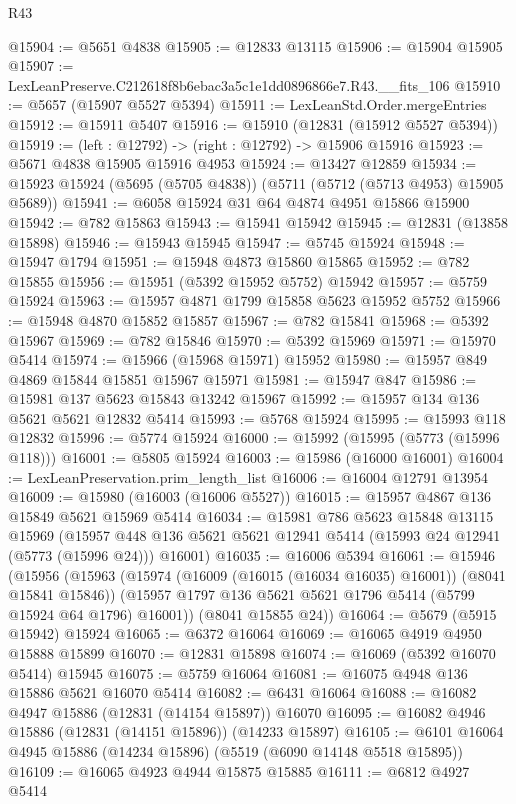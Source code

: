 \begin{lexlean}{R43}
\begin{coremodule}
@15904 := @5651 @4838
@15905 := @12833 @13115
@15906 := @15904 @15905
@15907 := LexLeanPreserve.C212618f8b6ebac3a5c1e1dd0896866e7.R43.__fits_106
@15910 := @5657 (@15907 @5527 @5394)
@15911 := LexLeanStd.Order.mergeEntries
@15912 := @15911 @5407
@15916 := @15910 (@12831 (@15912 @5527 @5394))
@15919 := (left : @12792) -> (right : @12792) -> @15906 @15916
@15923 := @5671 @4838 @15905 @15916 @4953
@15924 := @13427 @12859
@15934 := @15923 @15924 (@5695 (@5705 @4838)) (@5711 (@5712 (@5713 @4953) @15905 @5689))
@15941 := @6058 @15924 @31 @64 @4874 @4951 @15866 @15900
@15942 := @782 @15863
@15943 := @15941 @15942
@15945 := @12831 (@13858 @15898)
@15946 := @15943 @15945
@15947 := @5745 @15924
@15948 := @15947 @1794
@15951 := @15948 @4873 @15860 @15865
@15952 := @782 @15855
@15956 := @15951 (@5392 @15952 @5752) @15942
@15957 := @5759 @15924
@15963 := @15957 @4871 @1799 @15858 @5623 @15952 @5752
@15966 := @15948 @4870 @15852 @15857
@15967 := @782 @15841
@15968 := @5392 @15967
@15969 := @782 @15846
@15970 := @5392 @15969
@15971 := @15970 @5414
@15974 := @15966 (@15968 @15971) @15952
@15980 := @15957 @849 @4869 @15844 @15851 @15967 @15971
@15981 := @15947 @847
@15986 := @15981 @137 @5623 @15843 @13242 @15967
@15992 := @15957 @134 @136 @5621 @5621 @12832 @5414
@15993 := @5768 @15924
@15995 := @15993 @118 @12832
@15996 := @5774 @15924
@16000 := @15992 (@15995 (@5773 (@15996 @118)))
@16001 := @5805 @15924
@16003 := @15986 (@16000 @16001)
@16004 := LexLeanPreservation.prim_length_list
@16006 := @16004 @12791 @13954
@16009 := @15980 (@16003 (@16006 @5527))
@16015 := @15957 @4867 @136 @15849 @5621 @15969 @5414
@16034 := @15981
    @786
    @5623
    @15848
    @13115
    @15969
    (@15957 @448 @136 @5621 @5621 @12941 @5414 (@15993 @24 @12941 (@5773 (@15996 @24))) @16001)
@16035 := @16006 @5394
@16061 := @15946
    (@15956
      (@15963
        (@15974 (@16009 (@16015 (@16034 @16035) @16001)) (@8041 @15841 @15846))
        (@15957 @1797 @136 @5621 @5621 @1796 @5414 (@5799 @15924 @64 @1796) @16001))
      (@8041 @15855 @24))
@16064 := @5679 (@5915 @15942) @15924
@16065 := @6372 @16064
@16069 := @16065 @4919 @4950 @15888 @15899
@16070 := @12831 @15898
@16074 := @16069 (@5392 @16070 @5414) @15945
@16075 := @5759 @16064
@16081 := @16075 @4948 @136 @15886 @5621 @16070 @5414
@16082 := @6431 @16064
@16088 := @16082 @4947 @15886 (@12831 (@14154 @15897)) @16070
@16095 := @16082 @4946 @15886 (@12831 (@14151 @15896)) (@14233 @15897)
@16105 := @6101 @16064 @4945 @15886 (@14234 @15896) (@5519 (@6090 @14148 @5518 @15895))
@16109 := @16065 @4923 @4944 @15875 @15885
@16111 := @6812 @4927 @5414

\end{coremodule}
\end{lexlean}
